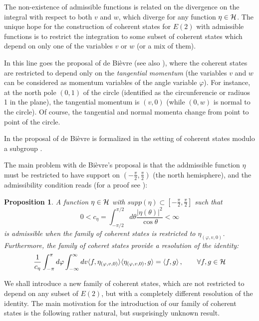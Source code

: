 \documentclass[11pt]{article}
\newtheorem{proposition}{Proposition}[section]
\begin{document}
The non-existence of admissible functions is related on the divergence on the integral with respect to both  $v$ and $w$, which diverge for any function $\eta\in{\cal H}$. The unique hope for the construction of coherent states for $E(2)$ with admissible functions is to restrict the integration to some subset of coherent states which depend on only one of the variables $v$ or $w$ (or a mix of them).

In this line goes the proposal of de Bi\`evre \cite{DeBievre89}  (see also  \cite{Torresani95}),
where the coherent states are restricted to depend only on the \textit{tangential momentum} (the variables $v$ and $w$ can be considered as momentum variables of the angle variable $\varphi$). For instance, at the north pole $(0,1)$ of the circle (identified as the circunferencie or radiuos 1 in the plane), the tangential momentum is $(v,0)$ (while $(0,w)$ is normal to the circle). Of course, the tangential and normal momenta change from point to point of the circle.

In \cite{Gazeau18} the proposal of de Bi\`evre is formalized in the setting of coherent states modulo a subgroup \cite{AAG14}.

The main problem with de Bi\`evre's proposal is that the addmissible function $\eta$ must be restricted to have support on $(-\frac{\pi}{2},\frac{\pi}{2})$ (the north hemisphere), and the admissibility condition reads (for a proof see \cite{DeBievre89,Torresani95,Gazeau18}):
%
\begin{proposition}
 A function $\eta\in{\cal H}$ with $supp(\eta)\subset [-\frac{\pi}{2}, \frac{\pi}{2}]$ such that 
 \begin{equation}
  0<c_\eta=\int_{-\pi/2}^{\pi/2}d\theta  \frac{|\eta(\theta)|^2}{\cos\theta} <\infty
 \end{equation}
 is admissible when the family of coherent states is restricted to $\eta_{(\varphi,v,0)}$. Furthermore, the family of coheret states provide a resolution of the identity:
 \begin{equation}
 \frac{1}{c_\eta} \int_{-\pi}^\pi d\varphi \int_{-\infty}^\infty dv \langle f,\eta_{(\varphi,v,0)}\rangle
  \langle \eta_{(\varphi,v,0)},g\rangle = \langle f,g\rangle\,,\qquad \forall f,g\in{\cal H}
 \end{equation}

 \end{proposition}
 
 We shall introduce a new family of coherent states, which are not restricted to depend on any subset of $E(2)$, but  with a completely different resolution of the identity.
The main motivation for the introduction of our family of coherent states is the following rather natural, but susprisingly unknown result.
 
\end{document}
